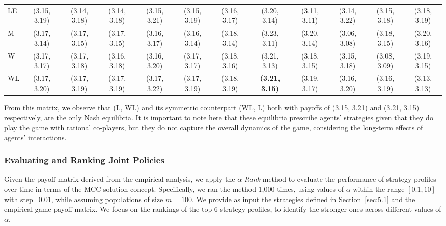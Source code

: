 \begin{table}[h!]
{\begin{tabular}{lccccccccccc}
                LE & (3.15, 3.19) & (3.14, 3.18) & (3.14, 3.18) & (3.15, 3.21) & (3.15, 3.19) & (3.16, 3.17) & (3.20, 3.14) & (3.11, 3.11) & (3.14, 3.22) & (3.15, 3.18) & (3.18, 3.19) \\
                
                M  & (3.17, 3.14) & (3.17, 3.15) & (3.17, 3.15) & \cellcolor{gray!16}(3.16, 3.17) & (3.16, 3.14) & (3.18, 3.14) & (3.23, 3.11) & (3.20, 3.14) & (3.06, 3.08) & (3.18, 3.15) & (3.20, 3.16) \\
                
                W  & (3.17, 3.17) & (3.17, 3.18) & (3.16, 3.18) & \cellcolor{gray!16}(3.16, 3.20) & (3.17, 3.17) & (3.18, 3.16) & (3.21, 3.13) & (3.18, 3.15) & (3.15, 3.18) & (3.08, 3.09) & (3.19, 3.15) \\
            
                WL & (3.17, 3.20) & (3.17, 3.19) & (3.17, 3.19) & (3.17, 3.22) & (3.17, 3.19) & (3.18, 3.19) & \textbf{(3.21, 3.15)} & (3.19, 3.17) & \cellcolor{gray!16}(3.16, 3.20) & (3.16, 3.19) & (3.13, 3.13) \\
                \hline
            \end{tabular}
            }
        \end{table}

        \noindent
        From this matrix, we observe that (L, WL) and its symmetric counterpart (WL, L) both with payoffs of (3.15, 3.21) and (3.21, 3.15) respectively, are the only Nash equilibria. It is important to note here that these equilibria prescribe agents' strategies given that they do play the game with rational co-players, but they do not capture the overall dynamics of the game, considering the long-term effects of agents' interactions.

    \subsubsection{Evaluating and Ranking Joint Policies}

        Given the payoff matrix derived from the empirical analysis, we apply the \emph{$\alpha$-Rank} method to evaluate the performance of strategy profiles over time in terms of the MCC solution concept. Specifically, we ran the method 1,000 times, using values of $\alpha$ within the range $[0.1, 10]$ with step=0.01, while assuming populations of size $m=100$. We provide as input the strategies defined in Section~\ref{sec:5.1} and the empirical game payoff matrix. We focus on the rankings of the top 6 strategy profiles, to identify the stronger ones across different values of $\alpha$.\tinydouble

